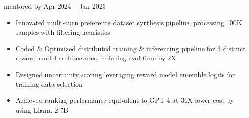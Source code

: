     {{\bodyfontsize \color{body} mentored by} }
    {Apr 2024 -- Jan 2025}{}{}
\begin{itemize}

    \item Innovated multi-turn preference dataset synthesis pipeline, processing 100K samples with filtering heuristics


    \item Coded \& Optimized distributed training \& inferencing pipeline for 3 distinct reward model architectures, reducing eval time by 2X

    \item Designed uncertainty scoring leveraging reward model ensemble logits for training data selection

    \item Achieved ranking performance equivalent to GPT-4 at 30X lower cost by using Llama 2 7B
\end{itemize}
\dividerSmall


